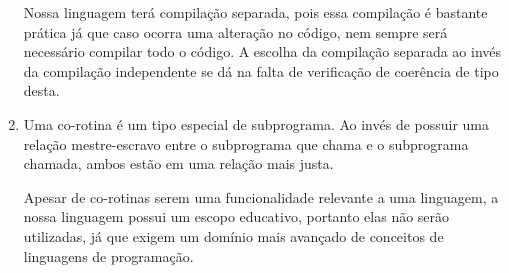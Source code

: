 \documentclass[12pt, a4paper]{article}
\begin{document}
\begin{enumerate}
        Nossa linguagem terá compilação separada, pois essa compilação é
        bastante prática já que caso ocorra uma alteração no código, nem sempre
        será necessário compilar todo o código. A escolha da compilação
        separada ao invés da compilação independente se dá na falta de
        verificação de coerência de tipo desta.

        \item
        Uma co-rotina é um tipo especial de subprograma. Ao invés de possuir
        uma relação mestre-escravo entre o subprograma que chama e o
        subprograma chamada, ambos estão em uma relação mais justa.

        Apesar de co-rotinas serem uma funcionalidade relevante a uma
        linguagem, a nossa linguagem possui um escopo educativo, portanto elas
        não serão utilizadas, já que exigem um domínio mais avançado de
        conceitos de linguagens de programação.

    \end{enumerate}
\end{document}
